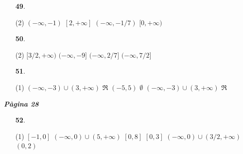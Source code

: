 \documentclass[a4paper, pdf, twoside]{book}
\begin{document}
\begin{multicols}{2}
\begin{enumerate}

 \item[\fontfamily{phv}\selectfont\color{blue}\textbf{49}. ] 
 \begin{tasks}[column-sep=1em, item-indent=1.3333em](2)
	 \task $(-\infty ,-1)$
	 \task $[2,+\infty ]$
	 \task $(-\infty ,-1/7)$
	 \task $[0,+\infty )$
\end{tasks}
\vspace{0.25cm}



 \item[\fontfamily{phv}\selectfont\color{blue}\textbf{50}. ] 
 \begin{tasks}[column-sep=1em, item-indent=1.3333em](2)
	 \task $[3/2,+\infty )$
	 \task $(-\infty ,-9]$
	 \task $(-\infty ,2/7]$
	 \task $(-\infty ,7/2]$
\end{tasks}
\vspace{0.25cm}



 \item[\fontfamily{phv}\selectfont\color{blue}\textbf{51}. ] 
 \begin{tasks}[column-sep=1em, item-indent=1.3333em](1)
	 \task* $(-\infty ,-3)\cup (3,+\infty )$
	 \task $\Re $
	 \task $(-5,5)$
	 \task $\emptyset $
	 \task* $(-\infty ,-3)\cup (3,+\infty )$
	 \task $\Re $
\end{tasks}
 \end{enumerate}
\vspace{0.3cm}


{\textbf{\em Pàgina 28}} \hrulefill
\begin{enumerate}
\vspace{0.25cm}



 \item[\fontfamily{phv}\selectfont\color{blue}\textbf{52}. ] 
 \begin{tasks}[column-sep=1em, item-indent=1.3333em](1)
	 \task $[-1,0]$
	 \task* $(-\infty ,0)\cup (5,+\infty )$
	 \task $[0,8]$
	 \task $[0,3]$
	 \task* $(-\infty ,0)\cup (3/2,+\infty )$
	 \task $(0,2)$
\end{tasks}
 \end{enumerate}
\begin{enumerate}
\vspace{0.25cm}



\end{enumerate}
\end{multicols}
\end{document}
